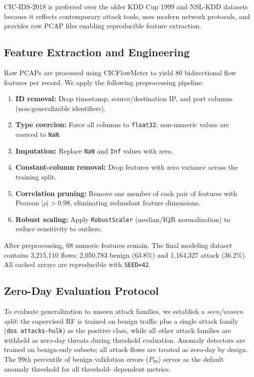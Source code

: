 \documentclass[10pt,journal,compsoc]{IEEEtran}
\begin{document}
CIC-IDS-2018 is preferred over the older KDD Cup 1999 and NSL-KDD
datasets \cite{tavallaee2009nsl} because it reflects contemporary
attack tools, uses modern network protocols, and provides raw PCAP
files enabling reproducible feature extraction.

\subsection{Feature Extraction and Engineering}

Raw PCAPs are processed using CICFlowMeter to yield 80 bidirectional
flow features per record.  We apply the following preprocessing
pipeline:

\begin{enumerate}[leftmargin=*,noitemsep,topsep=2pt]
  \item \textbf{ID removal:} Drop timestamp, source/destination IP,
        and port columns (non-generalizable identifiers).
  \item \textbf{Type coercion:} Force all columns to \texttt{float32};
        non-numeric values are coerced to \texttt{NaN}.
  \item \textbf{Imputation:} Replace \texttt{NaN} and \texttt{Inf}
        values with zero.
  \item \textbf{Constant-column removal:} Drop features with zero
        variance across the training split.
  \item \textbf{Correlation pruning:} Remove one member of each pair
        of features with Pearson $|\rho| > 0.98$, eliminating
        redundant feature dimensions.
  \item \textbf{Robust scaling:} Apply \texttt{RobustScaler}
        (median/IQR normalization) to reduce sensitivity to outliers.
\end{enumerate}

After preprocessing, 68 numeric features remain.  The final modeling
dataset contains 3{,}215{,}110 flows: 2{,}050{,}783 benign
(63.8\%) and 1{,}164{,}327 attack (36.2\%).  All cached arrays are
reproducible with \texttt{SEED=42}.

\subsection{Zero-Day Evaluation Protocol}

To evaluate generalization to unseen attack families, we establish a
\emph{seen/unseen split}: the supervised RF is trained on benign
traffic plus a single attack family (\texttt{dos attacks-hulk}) as
the positive class, while all other attack families are withheld as
zero-day threats during threshold evaluation.  Anomaly detectors are
trained on benign-only subsets; all attack flows are treated as
zero-day by design.  The 99th percentile of benign validation errors
($P_{99}$) serves as the default anomaly threshold for all threshold-
dependent metrics.
\end{document}
